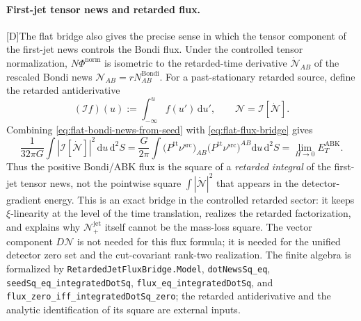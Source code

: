 \documentclass[11pt,a4paper]{article}
\newcommand{\cN}{\mathcal{N}}
\newcommand{\diff}{\mathrm{d}}
\newcommand{\statusD}{\textsf{[D]}}
\begin{document}
\paragraph{First-jet tensor news and retarded flux.}
\statusD The flat bridge also gives the precise sense in which the tensor component of the first-jet news controls the Bondi flux.  Under the controlled tensor normalization, \(N\Phi^{\mathrm{norm}}\) is isometric to the retarded-time derivative \(\dot{\cN}_{AB}\) of the rescaled Bondi news \(\cN_{AB}=rN^{\mathrm{Bondi}}_{AB}\).  For a past-stationary retarded source, define the retarded antiderivative
\[
  (\mathcal I f)(u):=\int_{-\infty}^{u}f(u')\,\diff u' ,
  \qquad
  \cN=\mathcal I[\dot{\cN}] .
\]
Combining \eqref{eq:flat-bondi-news-from-seed} with \eqref{eq:flat-flux-bridge} gives
\begin{equation}\label{eq:retarded-jet-flux-bridge}
  \frac{1}{32\pi G}
  \int |\mathcal I[\dot{\cN}]|^2\,\diff u\,\diff^2S
  =
  \frac{G}{2\pi}
  \int
  \big(P^{\mathrm{tt}}\nu^{\mathrm{src}}\big)_{AB}
  \big(P^{\mathrm{tt}}\nu^{\mathrm{src}}\big)^{AB}
  \diff u\,\diff^2S
  =
  \lim_{H\to0}E_T^{\mathrm{ABK}} .
\end{equation}
Thus the positive Bondi/ABK flux is the square of a \emph{retarded integral} of the first-jet tensor news, not the pointwise square \(\int|\dot{\cN}|^2\) that appears in the detector-gradient energy.  This is an exact bridge in the controlled retarded sector: it keeps \(\xi\)-linearity at the level of the time translation, realizes the retarded factorization, and explains why \(\cN^{\mathrm{jet}}_+\) itself cannot be the mass-loss square.  The vector component \(D\cN\) is not needed for this flux formula; it is needed for the unified detector zero set and the cut-covariant rank-two realization.  The finite algebra is formalized by \texttt{RetardedJetFluxBridge.Model}, \texttt{dotNewsSq\_eq}, \texttt{seedSq\_eq\_integratedDotSq}, \texttt{flux\_eq\_integratedDotSq}, and \texttt{flux\_zero\_iff\_integratedDotSq\_zero}; the retarded antiderivative and the analytic identification of its square are external inputs.
\end{document}
